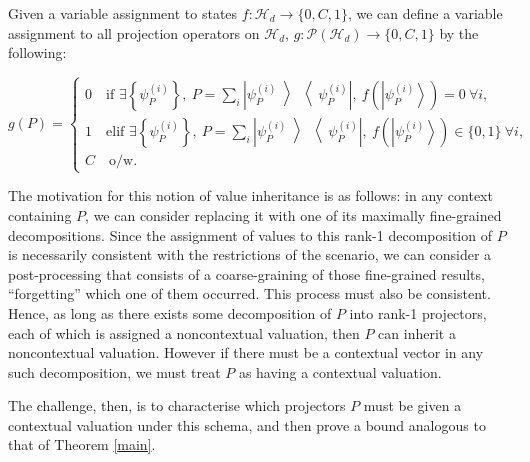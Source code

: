 \documentclass{amsart}
\theoremstyle{definition}
\newcommand{\ket}[1]{{\left\vert{#1}\right\rangle}}
\newcommand{\ketbra}[1]{{\left\vert {#1}\middle\rangle\middle\langle{#1}\right\vert}}
\begin{document}
Given a variable assignment to states $f:\mathcal{H}_d\rightarrow \{0,C,1\}$, we can define a variable assignment to all projection operators on $\mathcal{H}_d$, $g:\mathcal{P}(\mathcal{H}_d)\rightarrow \{0,C,1\}$ by the following:

\begin{equation}
g(P)=\begin{cases}
0\quad \mbox{if } \exists \left\{\psi_P^{(i)}\right\}, \>P=\sum_i \ketbra{\psi_P^{(i)}}, \>f\left(\ket{\psi_P^{(i)}}\right)=0\>\forall i,\\
1\quad \mbox{elif } \exists \left\{\psi_P^{(i)}\right\}, \>P=\sum_i \ketbra{\psi_P^{(i)}}, \>f\left(\ket{\psi_P^{(i)}}\right)\in\{0,1\}\>\forall i, \\
C\quad \mbox{o/w.}
\end{cases}
\end{equation}

The motivation for this notion of value inheritance is as follows: in any context containing $P$, we can consider replacing it with one of its maximally fine-grained decompositions. Since the assignment of values to this rank-1 decomposition of $P$ is necessarily consistent with the restrictions of the scenario, we can consider a post-processing that consists of a coarse-graining of those fine-grained results, ``forgetting'' which one of them occurred. This process must also be consistent. Hence, as long as there exists some decomposition of $P$ into rank-1 projectors, each of which is assigned a noncontextual valuation, then $P$ can inherit a noncontextual valuation. However if there must be a contextual vector in any such decomposition, we must treat $P$ as having a contextual valuation.

The challenge, then, is to characterise which projectors $P$ must be given a contextual valuation under this schema, and then prove a bound analogous to that of Theorem \ref{main}.
\end{document}

